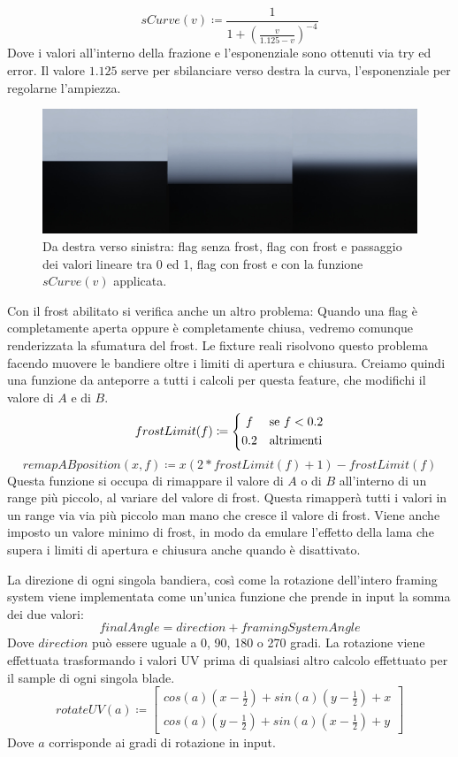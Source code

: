 \documentclass[main.tex]{subfiles}
\begin{document}
\[sCurve(v) \coloneqq \frac{1}{1 + (\frac{v}{1.125 - v})^{-4}}\]
Dove i valori all'interno della frazione e l'esponenziale sono ottenuti via try ed error. Il valore $1.125$ serve per sbilanciare verso destra la curva, l'esponenziale per regolarne l'ampiezza.
\begin{figure}[H]
    \centering
    \includegraphics[width=1\linewidth]{img/newFeatures/shaperFixes.jpg}
    \caption{Da destra verso sinistra: flag senza frost, flag con frost e passaggio dei valori lineare tra 0 ed 1, flag con frost e con la funzione $sCurve(v)$ applicata.}
    \label{fig:5_shaperFixes}
\end{figure}


Con il frost abilitato si verifica anche un altro problema: Quando una flag è completamente aperta oppure è completamente chiusa, vedremo comunque renderizzata la sfumatura del frost. Le fixture reali risolvono questo problema facendo muovere le bandiere oltre i limiti di apertura e chiusura. Creiamo quindi una funzione da anteporre a tutti i calcoli per questa feature, che modifichi il valore di $A$ e di $B$. 
\[frostLimit(f) \coloneqq 
	\begin{dcases}
		\hfil f & \text{se } f < 0.2\\
		0.2 & \text{altrimenti}
	\end{dcases}
\]
\[remapABposition(x, f) \coloneqq x(2 * frostLimit(f) + 1) - frostLimit(f)\]
Questa funzione si occupa di rimappare il valore di $A$ o di $B$ all'interno di un range più piccolo, al variare del valore di frost. Questa rimapperà tutti i valori in un range via via più piccolo man mano che cresce il valore di frost. Viene anche imposto un valore minimo di frost, in modo da emulare l'effetto della lama che supera i limiti di apertura e chiusura anche quando è disattivato.
\newline

La direzione di ogni singola bandiera, così come la rotazione dell'intero framing system viene implementata come un'unica funzione \cite{UVrotation} che prende in input la somma dei due valori:
\[finalAngle = direction + framingSystemAngle\]
Dove $direction$ può essere uguale a 0, 90, 180 o 270 gradi. La rotazione viene effettuata trasformando i valori UV prima di qualsiasi altro calcolo effettuato per il sample di ogni singola blade.
\[rotateUV(a) \coloneqq 
	\begin{bmatrix}
		cos(a)(x - \frac{1}{2}) + sin(a)(y - \frac{1}{2}) + x \\
		cos(a)(y - \frac{1}{2}) + sin(a)(x - \frac{1}{2}) + y
	\end{bmatrix}
\]
Dove $a$ corrisponde ai gradi di rotazione in input.
\end{document}
